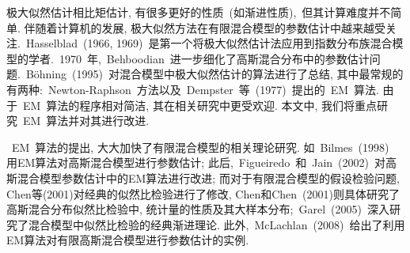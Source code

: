 \documentclass[a4paper,12pt,openany,oneside,utf-8]{ctexbook}
\begin{document}
极大似然估计相比矩估计, 有很多更好的性质~(如渐进性质),~但其计算难度并不简单. 伴随着计算机的发展, 极大似然方法在有限混合模型的参数估计中越来越受关注.~Hasselblad~(1966, 1969)~是第一个将极大似然估计法应用到指数分布族混合模型的学者.~1970~年,~Behboodian~进一步细化了高斯混合分布中的参数估计问题.~Böhning~(1995)~对混合模型中极大似然估计的算法进行了总结, 其中最常规的有两种:~Newton-Raphson~方法以及~Dempster~等~(1977)~提出的~EM~算法. 由于~EM~算法的程序相对简洁, 其在相关研究中更受欢迎. 本文中, 我们将重点研究~EM~算法并对其进行改进. 

~EM~算法的提出, 大大加快了有限混合模型的相关理论研究. 如~Bilmes~(1998)~\\
用EM算法对高斯混合模型进行参数估计; 此后,~Figueiredo~和~Jain~(2002)~对高斯混合模型参数估计中的EM算法进行改进; 而对于有限混合模型的假设检验问题, Chen等(2001)对经典的似然比检验进行了修改, Chen和Chen~(2001)则具体研究了高斯混合分布似然比检验中, 统计量的性质及其大样本分布;~Garel~(2005)~深入研究了混合模型中似然比检验的经典渐进理论. 此外,~McLachlan~(2008)~给出了利用EM算法对有限高斯混合模型进行参数估计的实例. %
\end{document}
